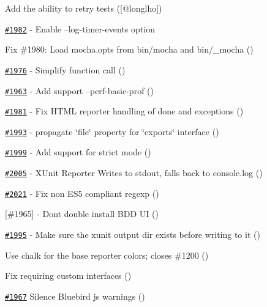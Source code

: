 \begin{DoxyItemize}
\item Add the ability to retry tests (\mbox{[}@longlho\mbox{]})
\item \href{https://github.com/mochajs/mocha/pull/1982}{\tt \#1982} -\/ Enable --log-\/timer-\/events option \href{https://github.com/Alaneor}{\tt }
\item Fix \#1980\+: Load mocha.\+opts from bin/mocha and bin/\+\_\+mocha (\href{https://github.com/danielstjules}{\tt })
\item \href{https://github.com/mochajs/mocha/pull/1976}{\tt \#1976} -\/ Simplify function call (\href{https://github.com/iclanzan}{\tt })
\item \href{https://github.com/mochajs/mocha/pull/1963}{\tt \#1963} -\/ Add support --perf-\/basic-\/prof (\href{https://github.com/robraux}{\tt })
\item \href{https://github.com/mochajs/mocha/pull/1981}{\tt \#1981} -\/ Fix H\+T\+ML reporter handling of done and exceptions (\href{https://github.com/Standard8}{\tt })
\item \href{https://github.com/mochajs/mocha/pull/1993}{\tt \#1993} -\/ propagate \char`\"{}file\char`\"{} property for \char`\"{}exports\char`\"{} interface (\href{https://github.com/segrey}{\tt })
\item \href{https://github.com/mochajs/mocha/pull/1999}{\tt \#1999} -\/ Add support for strict mode (\href{https://github.com/tmont}{\tt })
\item \href{https://github.com/mochajs/mocha/pull/2005}{\tt \#2005} -\/ X\+Unit Reporter Writes to stdout, falls back to console.\+log (\href{https://github.com/jonnyreeves}{\tt })
\item \href{https://github.com/mochajs/mocha/pull/2021}{\tt \#2021} -\/ Fix non E\+S5 compliant regexp (\href{https://github.com/zetaben}{\tt })
\item \mbox{[}\#1965\mbox{]} -\/ Don\textquotesingle{}t double install B\+DD UI (\href{https://github.com/cowboyd}{\tt })
\item \href{https://github.com/mochajs/mocha/pull/1995}{\tt \#1995} -\/ Make sure the xunit output dir exists before writing to it (\href{https://github.com/ianwremmel}{\tt })
\item Use chalk for the base reporter colors; closes \#1200 (\href{https://github.com/boneskull}{\tt })
\item Fix requiring custom interfaces (\href{https://github.com/jgkim}{\tt })
\item \href{https://github.com/mochajs/mocha/pull/1967}{\tt \#1967} Silence Bluebird js warnings (\href{https://github.com/krisr}{\tt })
\end{DoxyItemize}


